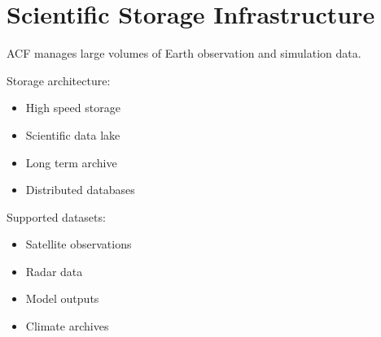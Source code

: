 \section{Scientific Storage Infrastructure}


ACF manages large volumes of Earth observation and simulation
data.



Storage architecture:


\begin{itemize}

\item High speed storage

\item Scientific data lake

\item Long term archive

\item Distributed databases

\end{itemize}



Supported datasets:


\begin{itemize}

\item Satellite observations

\item Radar data

\item Model outputs

\item Climate archives

\end{itemize}
